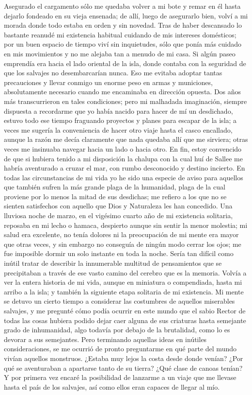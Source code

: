 \documentclass{novela}
\begin{document}
    Asegurado el cargamento sólo me quedaba volver a mi bote y remar en él hasta dejarlo fondeado en su vieja ensenada; de allí, luego de asegurarlo bien, volví a mi morada donde todo estaba en orden y sin novedad. Tras de haber descansado lo bastante reanudé mi existencia habitual cuidando de mis intereses domésticos; por un buen espacio de tiempo viví sin inquietudes, sólo que ponía más cuidado en mis movimientos y no me alejaba tan a menudo de mi casa. Si algún paseo emprendía era hacia el lado oriental de la isla, donde contaba con la seguridad de que los salvajes no desembarcarían nunca. Eso me evitaba adoptar tantas precauciones y llevar conmigo un enorme peso en armas y municiones, absolutamente necesario cuando me encaminaba en dirección opuesta.
    Dos años más transcurrieron en tales condiciones; pero mi malhadada imaginación, siempre dispuesta a recordarme que yo había nacido para hacer de mí un desdichado, estuvo todo ese tiempo fraguando proyectos y planes para escapar de la isla; a veces me sugería la conveniencia de hacer otro viaje hasta el casco encallado, aunque la razón me decía claramente que nada quedaba allí que me sirviera; otras veces me insinuaba navegar hacia un lado o hacia otro. En fin, estoy convencido de que si hubiera tenido a mi disposición la chalupa con la cual huí de Sallee me habría aventurado a cruzar el mar, con rumbo desconocido y destino incierto.
    En todas las circunstancias de mi vida yo he sido una especie de aviso para aquellos que también sufren la más grande plaga de la humanidad, plaga de la cual proviene por lo menos la mitad de sus desdichas; me refiero a los que no se sienten satisfechos con aquello que Dios y Naturaleza les han concedido.
    Una lluviosa noche de marzo, en el vigésimo cuarto año de mi existencia solitaria, reposaba en mi lecho o hamaca, despierto aunque sin sentir la menor molestia; mi salud era excelente, no tenía dolores ni la preocupación de mi mente era mayor que otras veces, y sin embargo no conseguía de ningún modo cerrar los ojos; me fue imposible dormir un solo instante en toda la noche.
    Sería tan difícil como inútil tratar de describir la innumerable multitud de pensamientos que se precipitaban a través de ese vasto camino del cerebro que es la memoria. Volvía a ver la entera historia de mi vida, aunque en miniatura o compendiada, hasta mi arribo a la isla; y también la siguiente etapa solitaria de mi existencia.
    Mi mente se detuvo un cierto tiempo a considerar las costumbres de aquellos miserables salvajes, y me pregunté cómo podía ocurrir en este mundo que el sabio Rector de todas las cosas hubiera podido dejar caer alguna de sus criaturas hasta semejante grado de inhumanidad, algo todavía por debajo de la brutalidad, como lo es devorar a sus semejantes. Pero terminando aquellas ideas en inútiles consideraciones, se me ocurrió de pronto preguntarme en qué parte del mundo vivían aquellos monstruos. ¿Estaba muy lejos la costa desde donde venían? ¿Por qué se aventuraban a apartarse tanto de su tierra? ¿Qué clase de canoas tenían? Y por primera vez encaré la posibilidad de lanzarme a un viaje que me llevase hasta el país de los salvajes, así como ellos eran capaces de llegar al mío.
\end{document}
